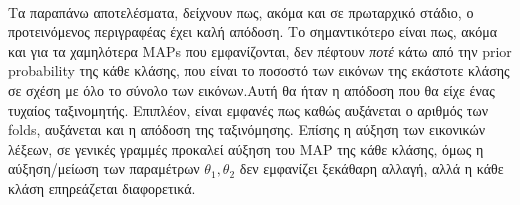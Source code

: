 \paragraph*{}
Τα παραπάνω αποτελέσματα, δείχνουν πως, ακόμα και σε πρωταρχικό στάδιο, ο προτεινόμενος περιγραφέας έχει καλή απόδοση. Το σημαντικότερο είναι πως, ακόμα και για τα χαμηλότερα MAPs που εμφανίζονται, δεν πέφτουν \textit{ποτέ} κάτω από την prior probability της κάθε κλάσης, που είναι το ποσοστό των εικόνων της εκάστοτε κλάσης σε σχέση με όλο το σύνολο των εικόνων.Αυτή θα ήταν η απόδοση που θα είχε ένας τυχαίος ταξινομητής. Επιπλέον, είναι εμφανές πως καθώς αυξάνεται ο αριθμός των folds, αυξάνεται και η απόδοση της ταξινόμησης. Επίσης η αύξηση των εικονικών λέξεων, σε γενικές γραμμές προκαλεί αύξηση του MAP της κάθε κλάσης, όμως η αύξηση/μείωση των παραμέτρων $\theta_1, \theta_2$ δεν εμφανίζει ξεκάθαρη αλλαγή, αλλά η κάθε κλάση επηρεάζεται διαφορετικά.




